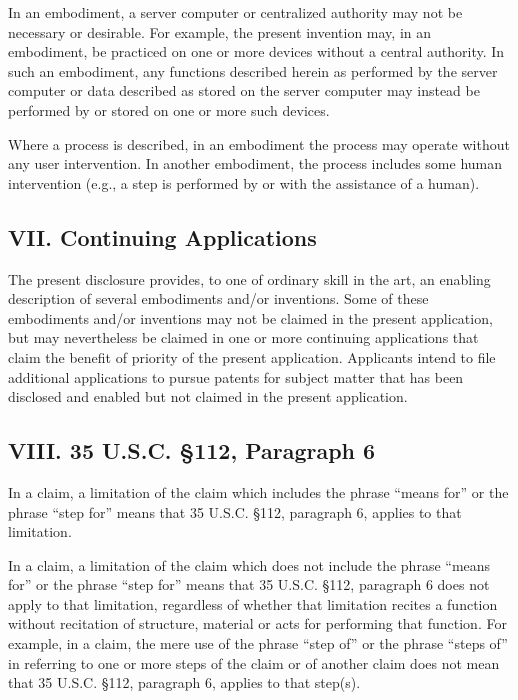 \documentclass[11pt,a4paper]{article}
\begin{document}
In an embodiment, a server computer or centralized authority may not be necessary or desirable. For example, the present invention may, in an embodiment, be practiced on one or more devices without a central authority. In such an embodiment, any functions described herein as performed by the server computer or data described as stored on the server computer may instead be performed by or stored on one or more such devices.

Where a process is described, in an embodiment the process may operate without any user intervention. In another embodiment, the process includes some human intervention (e.g., a step is performed by or with the assistance of a human).

\subsection{VII. Continuing Applications}

The present disclosure provides, to one of ordinary skill in the art, an enabling description of several embodiments and/or inventions. Some of these embodiments and/or inventions may not be claimed in the present application, but may nevertheless be claimed in one or more continuing applications that claim the benefit of priority of the present application. Applicants intend to file additional applications to pursue patents for subject matter that has been disclosed and enabled but not claimed in the present application.

\subsection{VIII. 35 U.S.C. §112, Paragraph 6}

In a claim, a limitation of the claim which includes the phrase “means for” or the phrase “step for” means that 35 U.S.C. §112, paragraph 6, applies to that limitation.

In a claim, a limitation of the claim which does not include the phrase “means for” or the phrase “step for” means that 35 U.S.C. §112, paragraph 6 does not apply to that limitation, regardless of whether that limitation recites a function without recitation of structure, material or acts for performing that function. For example, in a claim, the mere use of the phrase “step of” or the phrase “steps of” in referring to one or more steps of the claim or of another claim does not mean that 35 U.S.C. §112, paragraph 6, applies to that step(s).
\end{document}
